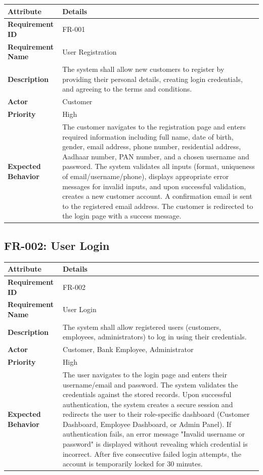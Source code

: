\documentclass[12pt,a4paper,oneside]{report}
\begin{document}
\begin{table}[htbp]
\centering
\small
\begin{tabularx}{\textwidth}{l l}
\toprule
\textbf{Attribute} & \textbf{Details} \\
\midrule
\textbf{Requirement ID} & FR-001 \\
\textbf{Requirement Name} & User Registration \\
\textbf{Description} & The system shall allow new customers to register by providing their personal details, creating login credentials, and agreeing to the terms and conditions. \\
\textbf{Actor} & Customer \\
\textbf{Priority} & High \\
\textbf{Expected Behavior} & The customer navigates to the registration page and enters required information including full name, date of birth, gender, email address, phone number, residential address, Aadhaar number, PAN number, and a chosen username and password. The system validates all inputs (format, uniqueness of email/username/phone), displays appropriate error messages for invalid inputs, and upon successful validation, creates a new customer account. A confirmation email is sent to the registered email address. The customer is redirected to the login page with a success message. \\
\bottomrule
\end{tabularx}
\end{table}

\subsection{FR-002: User Login}

\begin{table}[htbp]
\centering
\small
\begin{tabularx}{\textwidth}{l l}
\toprule
\textbf{Attribute} & \textbf{Details} \\
\midrule
\textbf{Requirement ID} & FR-002 \\
\textbf{Requirement Name} & User Login \\
\textbf{Description} & The system shall allow registered users (customers, employees, administrators) to log in using their credentials. \\
\textbf{Actor} & Customer, Bank Employee, Administrator \\
\textbf{Priority} & High \\
\textbf{Expected Behavior} & The user navigates to the login page and enters their username/email and password. The system validates the credentials against the stored records. Upon successful authentication, the system creates a secure session and redirects the user to their role-specific dashboard (Customer Dashboard, Employee Dashboard, or Admin Panel). If authentication fails, an error message "Invalid username or password" is displayed without revealing which credential is incorrect. After five consecutive failed login attempts, the account is temporarily locked for 30 minutes. \\
\bottomrule
\end{tabularx}
\end{table}
\end{document}
